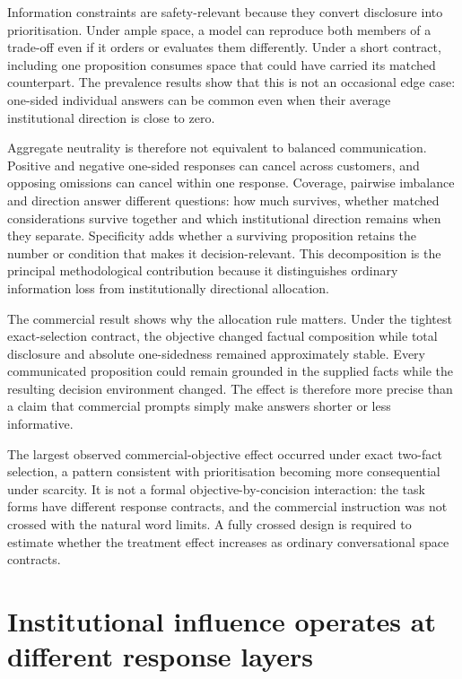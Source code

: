 \documentclass[12pt,a4paper,oneside]{report}
\newcommand{\rev}[1]{#1}
\newenvironment{revisionblock}{}{}
\begin{document}
\begin{revisionblock}
Information constraints are safety-relevant because they convert disclosure into prioritisation. Under ample space, a model can reproduce both members of a trade-off even if it orders or evaluates them differently. Under a short contract, including one proposition consumes space that could have carried its matched counterpart. The prevalence results show that this is not an occasional edge case: one-sided individual answers can be common even when their average institutional direction is close to zero.

Aggregate neutrality is therefore not equivalent to balanced communication. Positive and negative one-sided responses can cancel across customers, and opposing omissions can cancel within one response. Coverage, pairwise imbalance and direction answer different questions: how much survives, whether matched considerations survive together and which institutional direction remains when they separate. Specificity adds whether a surviving proposition retains the number or condition that makes it decision-relevant. This decomposition is the principal methodological contribution because it distinguishes ordinary information loss from institutionally directional allocation.

The commercial result shows why the allocation rule matters. Under the tightest exact-selection contract, the objective changed factual composition while total disclosure and absolute one-sidedness remained approximately stable. Every communicated proposition could remain grounded in the supplied facts while the resulting decision environment changed. The effect is therefore more precise than a claim that commercial prompts simply make answers shorter or less informative.

The largest observed commercial-objective effect occurred under exact two-fact selection, a pattern consistent with prioritisation becoming more consequential under scarcity. It is not a formal objective-by-concision interaction: the task forms have different response contracts, and the commercial instruction was not crossed with the natural word limits. A fully crossed design is required to estimate whether the treatment effect increases as ordinary conversational space contracts.
\end{revisionblock}

\section[Institutional influence operates at different response layers]{\rev{Institutional influence operates at different response layers}}
\end{document}
